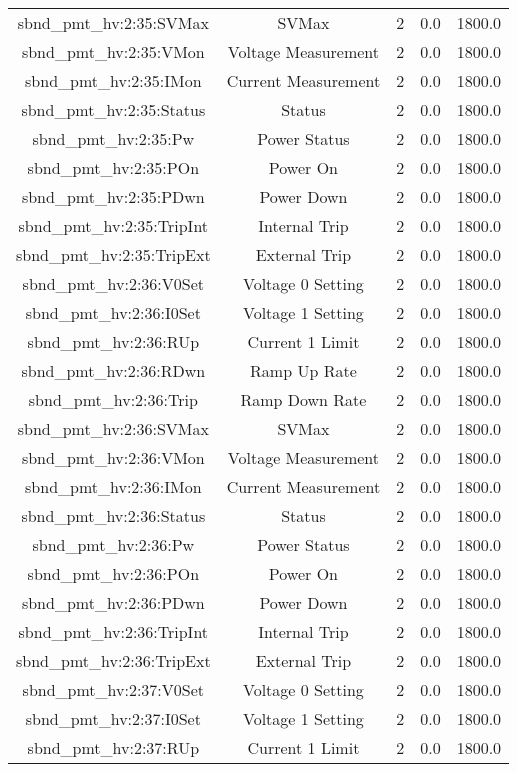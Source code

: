 \begin{table}[ptb]
\begin{tabular}{c | c c c c}
sbnd_pmt_hv:2:35:SVMax & SVMax & 2 & 0.0 & 1800.0\\ 
sbnd_pmt_hv:2:35:VMon & Voltage Measurement & 2 & 0.0 & 1800.0\\ 
sbnd_pmt_hv:2:35:IMon & Current Measurement & 2 & 0.0 & 1800.0\\ 
sbnd_pmt_hv:2:35:Status & Status & 2 & 0.0 & 1800.0\\ 
sbnd_pmt_hv:2:35:Pw & Power Status & 2 & 0.0 & 1800.0\\ 
sbnd_pmt_hv:2:35:POn & Power On & 2 & 0.0 & 1800.0\\ 
sbnd_pmt_hv:2:35:PDwn & Power Down & 2 & 0.0 & 1800.0\\ 
sbnd_pmt_hv:2:35:TripInt & Internal Trip & 2 & 0.0 & 1800.0\\ 
sbnd_pmt_hv:2:35:TripExt & External Trip & 2 & 0.0 & 1800.0\\ 
sbnd_pmt_hv:2:36:V0Set & Voltage 0 Setting & 2 & 0.0 & 1800.0\\ 
sbnd_pmt_hv:2:36:I0Set & Voltage 1 Setting & 2 & 0.0 & 1800.0\\ 
sbnd_pmt_hv:2:36:RUp & Current 1 Limit & 2 & 0.0 & 1800.0\\ 
sbnd_pmt_hv:2:36:RDwn & Ramp Up Rate & 2 & 0.0 & 1800.0\\ 
sbnd_pmt_hv:2:36:Trip & Ramp Down Rate & 2 & 0.0 & 1800.0\\ 
sbnd_pmt_hv:2:36:SVMax & SVMax & 2 & 0.0 & 1800.0\\ 
sbnd_pmt_hv:2:36:VMon & Voltage Measurement & 2 & 0.0 & 1800.0\\ 
sbnd_pmt_hv:2:36:IMon & Current Measurement & 2 & 0.0 & 1800.0\\ 
sbnd_pmt_hv:2:36:Status & Status & 2 & 0.0 & 1800.0\\ 
sbnd_pmt_hv:2:36:Pw & Power Status & 2 & 0.0 & 1800.0\\ 
sbnd_pmt_hv:2:36:POn & Power On & 2 & 0.0 & 1800.0\\ 
sbnd_pmt_hv:2:36:PDwn & Power Down & 2 & 0.0 & 1800.0\\ 
sbnd_pmt_hv:2:36:TripInt & Internal Trip & 2 & 0.0 & 1800.0\\ 
sbnd_pmt_hv:2:36:TripExt & External Trip & 2 & 0.0 & 1800.0\\ 
sbnd_pmt_hv:2:37:V0Set & Voltage 0 Setting & 2 & 0.0 & 1800.0\\ 
sbnd_pmt_hv:2:37:I0Set & Voltage 1 Setting & 2 & 0.0 & 1800.0\\ 
sbnd_pmt_hv:2:37:RUp & Current 1 Limit & 2 & 0.0 & 1800.0\\ 

\end{tabular}
\end{table}
